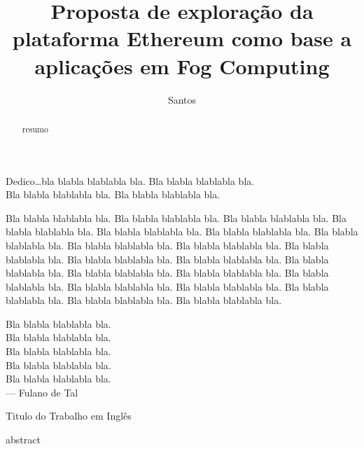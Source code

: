 \documentclass[tcc,capa]{texufpel}
\title{Proposta de exploração da plataforma Ethereum como base a aplicações em Fog Computing}
\author{Santos}{Gustavo Fernandes dos}
\begin{document}
\renewcommand{\advisorname}{Orientadora}           %

\newcommand{\bchain}{\textit{blockchain} }
\newcommand{\Bchain}{\textit{Blockchain} }

\maketitle 

\sloppy

\fichacatalografica

\folhadeaprovacao

\begin{dedicatoria}
  Dedico\ldots bla blabla blablabla bla. Bla blabla blablabla bla.\\
  Bla blabla blablabla bla. Bla blabla blablabla bla.
\end{dedicatoria}

\begin{agradecimentos}
  Bla blabla blablabla bla.  Bla blabla blablabla bla.  Bla blabla blablabla
  bla.  Bla blabla blablabla bla.  Bla blabla blablabla bla.  Bla blabla
  blablabla bla.  Bla blabla blablabla bla.  Bla blabla blablabla bla.  Bla
  blabla blablabla bla.  Bla blabla blablabla bla.  Bla blabla blablabla bla.
  Bla blabla blablabla bla.  Bla blabla blablabla bla.  Bla blabla blablabla
  bla.  Bla blabla blablabla bla.  Bla blabla blablabla bla.  Bla blabla
  blablabla bla.  Bla blabla blablabla bla.  Bla blabla blablabla bla.  Bla
  blabla blablabla bla.  Bla blabla blablabla bla.
\end{agradecimentos}

\begin{epigrafe}
  Bla blabla blablabla bla.\\
  Bla blabla blablabla bla.\\
  Bla blabla blablabla bla.\\
  Bla blabla blablabla bla.\\
  Bla blabla blablabla bla.\\
  {\sc --- Fulano de Tal}
\end{epigrafe}

\begin{abstract}
  resumo
\end{abstract}

\begin{englishabstract}%
  {Titulo do Trabalho em Inglês}
  
	abstract
\end{englishabstract}
\end{document}
